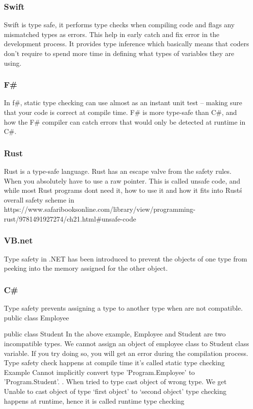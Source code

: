 \documentclass{sig-alternate}
\begin{document}
\subsubsection{Swift}
Swift is type safe, it performs type checks when compiling code and flags any mismatched types as errors. This help in early catch and fix error in the development process. 
It provides type inference which basically means that coders don’t require to spend more time in defining what types of variables they are using.
\subsubsection{F\#}
In f\#, static type checking can use almost as an instant unit test – making sure that your code is correct at compile time.
F\# is more type-safe than C\#, and how the F\# compiler can catch errors that would only be detected at runtime in C\#.
\subsubsection{Rust }
Rust is a type-safe language. Rust has an escape valve from the safety rules. When you absolutely have to use a raw pointer. This is called unsafe code, and while most Rust programs dont need it, 
how to use it and how it fits into Rust\'s overall safety scheme in
 \\ https://www.safaribooksonline.com/library/view/programming-rust/9781491927274/ch21.html\#unsafe-code

\subsubsection{VB.net}
Type safety in .NET has been introduced to prevent the objects of one type from peeking into the memory assigned for the other object.
\subsubsection{C\#}
Type safety prevents assigning a type to another type when are not compatible.
public class Employee{}

public class Student{}
In the above example, Employee and Student are two incompatible types. We cannot assign an object of employee class to Student class variable. If you try doing so, you will get an error during the compilation process. Type safety check happens at compile time it's called static type checking
Example
Cannot implicitly convert type 'Program.Employee' to 'Program.Student'.
. When tried to type cast object of wrong type. We get 
Unable to cast object of type ‘first object’ to ‘second object’
type checking happens at runtime, hence it is called runtime type checking
\end{document}
